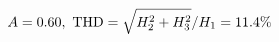 \documentclass[preview]{standalone}
\begin{document}
\begin{align*}
\special{dvisvgm:raw <g id='unique000'>}A=0.60,\ \text{THD}=\sqrt{H_2^2+H_3^2}/H_1=11.4\%\special{dvisvgm:raw </g>}
\end{align*}
\end{document}

